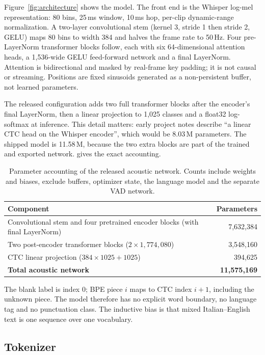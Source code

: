 \documentclass{article}
\begin{document}
Figure~\ref{fig:architecture} shows the model. The front end is the Whisper log-mel
representation: 80 bins, 25\,ms window, 10\,ms hop, per-clip dynamic-range normalization. A
two-layer convolutional stem (kernel 3, stride 1 then stride 2, GELU) maps 80 bins to width 384
and halves the frame rate to 50\,Hz. Four pre-LayerNorm transformer blocks follow, each with six
64-dimensional attention heads, a 1{,}536-wide GELU feed-forward network and a final
LayerNorm. Attention is bidirectional and masked by real-frame key padding; it is not causal or
streaming. Positions are fixed sinusoids generated as a non-persistent buffer, not learned
parameters.

The released configuration adds two full transformer blocks after the encoder's final
LayerNorm, then a linear projection to 1{,}025 classes and a float32 log-softmax at inference.
This detail matters: early project notes describe ``a linear CTC head on the Whisper encoder'',
which would be 8.03\,M parameters. The shipped model is 11.58\,M, because the two extra blocks
are part of the trained and exported network.  gives the exact accounting.

\begin{table}[t]
\centering
\small
\caption{Parameter accounting of the released acoustic network. Counts include weights and
biases, exclude buffers, optimizer state, the language model and the separate VAD network.}
\label{tab:params}
\begin{tabular}{@{}lr@{}}
\toprule
Component & Parameters \\
\midrule
Convolutional stem and four pretrained encoder blocks (with final LayerNorm) & 7{,}632{,}384 \\
Two post-encoder transformer blocks ($2\times1{,}774{,}080$) & 3{,}548{,}160 \\
CTC linear projection ($384\times1025+1025$) & 394{,}625 \\
\midrule
\textbf{Total acoustic network} & \textbf{11{,}575{,}169} \\
\bottomrule
\end{tabular}
\end{table}

The blank label is index 0; BPE piece $i$ maps to CTC index $i+1$, including the unknown piece.
The model therefore has no explicit word boundary, no language tag and no punctuation class. The
inductive bias is that mixed Italian--English text is one sequence over one vocabulary.

\subsection{Tokenizer}
\end{document}
